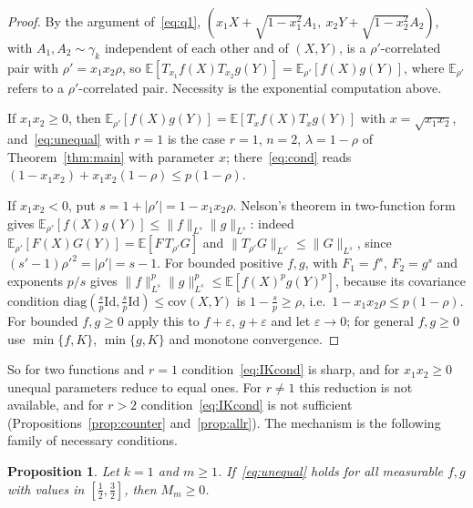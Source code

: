 \documentclass[11pt]{amsart}
\newtheorem{proposition}[theorem]{Proposition}
\theoremstyle{definition}
\newcommand{\E}{\mathbb{E}}
\newcommand{\Id}{\mathrm{Id}}
\begin{document}
\begin{proof}
By the argument of~\eqref{eq:q1}, $(x_1X+\sqrt{1-x_1^2}A_1,\ x_2Y+\sqrt{1-x_2^2}A_2)$, with $A_1,A_2\sim\gamma_k$
independent of each other and of $(X,Y)$, is a $\rho'$-correlated pair with $\rho'=x_1x_2\rho$, so
$\E[T_{x_1}f(X)T_{x_2}g(Y)]=\E_{\rho'}[f(X)g(Y)]$, where $\E_{\rho'}$ refers to a $\rho'$-correlated pair. Necessity is
the exponential computation above.

If $x_1x_2\ge0$, then $\E_{\rho'}[f(X)g(Y)]=\E[T_xf(X)T_xg(Y)]$ with $x=\sqrt{x_1x_2}$, and~\eqref{eq:unequal} with $r=1$ is
the case $r=1$, $n=2$, $\lambda=1-\rho$ of Theorem~\ref{thm:main} with parameter $x$; there~\eqref{eq:cond} reads
$(1-x_1x_2)+x_1x_2(1-\rho)\le p(1-\rho)$.

If $x_1x_2<0$, put $s=1+|\rho'|=1-x_1x_2\rho$. Nelson's theorem in two-function form gives
$\E_{\rho'}[f(X)g(Y)]\le\|f\|_{L^s}\|g\|_{L^s}$: indeed $\E_{\rho'}[F(X)G(Y)]=\E[F\,T_{\rho'}G]$ and
$\|T_{\rho'}G\|_{L^{s'}}\le\|G\|_{L^s}$, since $(s'-1)\rho'^2=|\rho'|=s-1$. For bounded positive $f,g$,
\cite[Theorem~B]{IK25} with $F_1=f^s$, $F_2=g^s$ and exponents $p/s$ gives
$\|f\|_{L^s}^p\|g\|_{L^s}^p\le\E[f(X)^pg(Y)^p]$, because its covariance condition
$\mathrm{diag}(\frac sp\Id,\frac sp\Id)\le\mathrm{cov}(X,Y)$ is $1-\frac sp\ge\rho$, i.e.\ $1-x_1x_2\rho\le p(1-\rho)$.
For bounded $f,g\ge0$ apply this to $f+\varepsilon$, $g+\varepsilon$ and let $\varepsilon\to0$; for general $f,g\ge0$
use $\min\{f,K\}$, $\min\{g,K\}$ and monotone convergence.
\end{proof}

So for two functions and $r=1$ condition~\eqref{eq:IKcond} is sharp, and for $x_1x_2\ge0$ unequal parameters reduce to
equal ones. For $r\ne1$ this reduction is not available, and for $r>2$ condition~\eqref{eq:IKcond} is not sufficient
(Propositions~\ref{prop:counter} and~\ref{prop:allr}). The mechanism is the following family of necessary conditions.

\begin{proposition}\label{prop:chaos}
Let $k=1$ and $m\ge1$. If~\eqref{eq:unequal} holds for all measurable $f,g$ with values in $[\frac12,\frac32]$, then
$M_m\ge0$.
\end{proposition}
\end{document}
